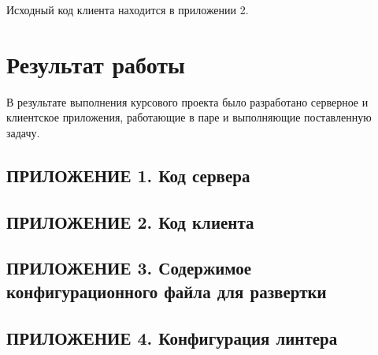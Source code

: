 \documentclass[a4paper, 12pt]{article}
\begin{document}
    Исходный код клиента находится в приложении 2.

    \section*{Результат работы}
    В результате выполнения курсового проекта было разработано серверное и клиентское приложения,
    работающие в паре и выполняющие поставленную задачу.

    \newpage
    \subsection*{ПРИЛОЖЕНИЕ 1. Код сервера}
    

    \newpage
    \subsection*{ПРИЛОЖЕНИЕ 2. Код клиента}
    

    \newpage
    \subsection*{ПРИЛОЖЕНИЕ 3. Содержимое конфигурационного файла для развертки}
    

    \newpage
    \subsection*{ПРИЛОЖЕНИЕ 4. Конфигурация линтера}
    
\end{document}
